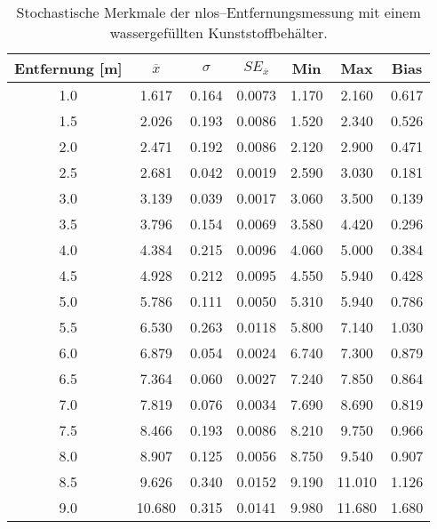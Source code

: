 \begin{appendices}
\begin{table}[h]
	\centering
	\begin{tabular}{||c||ccc||cc||c||}
\hline
Entfernung [\si{\meter}] & $\overline{x}$ & $\sigma$ & $SE_{\overline{x}}$ & Min & Max & Bias \\
\hline
\hline
\num{1.0} & \num{1.617} & \num{0.164} & \num{0.0073} & \num{1.170} & \num{2.160} & \num{0.617} \\
\num{1.5} & \num{2.026} & \num{0.193} & \num{0.0086} & \num{1.520} & \num{2.340} & \num{0.526} \\
\num{2.0} & \num{2.471} & \num{0.192} & \num{0.0086} & \num{2.120} & \num{2.900} & \num{0.471} \\
\num{2.5} & \num{2.681} & \num{0.042} & \num{0.0019} & \num{2.590} & \num{3.030} & \num{0.181} \\
\num{3.0} & \num{3.139} & \num{0.039} & \num{0.0017} & \num{3.060} & \num{3.500} & \num{0.139} \\
\num{3.5} & \num{3.796} & \num{0.154} & \num{0.0069} & \num{3.580} & \num{4.420} & \num{0.296} \\
\num{4.0} & \num{4.384} & \num{0.215} & \num{0.0096} & \num{4.060} & \num{5.000} & \num{0.384} \\
\num{4.5} & \num{4.928} & \num{0.212} & \num{0.0095} & \num{4.550} & \num{5.940} & \num{0.428} \\
\num{5.0} & \num{5.786} & \num{0.111} & \num{0.0050} & \num{5.310} & \num{5.940} & \num{0.786} \\
\num{5.5} & \num{6.530} & \num{0.263} & \num{0.0118} & \num{5.800} & \num{7.140} & \num{1.030} \\
\num{6.0} & \num{6.879} & \num{0.054} & \num{0.0024} & \num{6.740} & \num{7.300} & \num{0.879} \\
\num{6.5} & \num{7.364} & \num{0.060} & \num{0.0027} & \num{7.240} & \num{7.850} & \num{0.864} \\
\num{7.0} & \num{7.819} & \num{0.076} & \num{0.0034} & \num{7.690} & \num{8.690} & \num{0.819} \\
\num{7.5} & \num{8.466} & \num{0.193} & \num{0.0086} & \num{8.210} & \num{9.750} & \num{0.966} \\
\num{8.0} & \num{8.907} & \num{0.125} & \num{0.0056} & \num{8.750} & \num{9.540} & \num{0.907} \\
\num{8.5} & \num{9.626} & \num{0.340} & \num{0.0152} & \num{9.190} & \num{11.010} & \num{1.126} \\
\num{9.0} & \num{10.680} & \num{0.315} & \num{0.0141} & \num{9.980} & \num{11.680} & \num{1.680} \\
\hline
	\end{tabular}
	\caption{Stochastische Merkmale der \Gls{nlos}--Entfernungsmessung mit einem wassergefüllten Kunststoffbehälter.}
	\label{tab:entfernungsmessung_2018_01_20_nlos_water}
\end{table}


\end{appendices}
